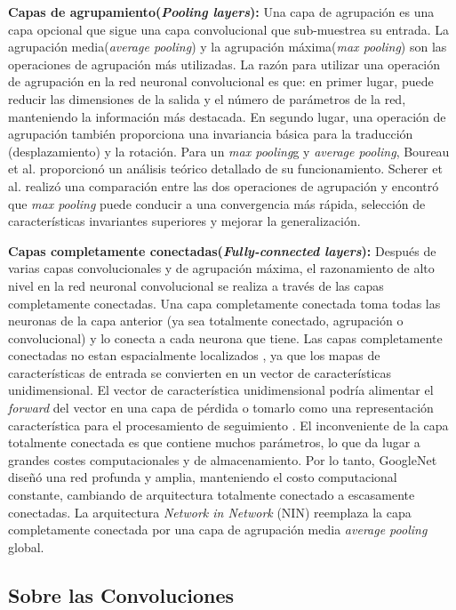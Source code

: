 \textbf{Capas de agrupamiento(\textit{Pooling layers}):} Una capa de agrupación es una capa opcional que sigue una capa convolucional que sub-muestrea su entrada. La agrupación media(\textit{average pooling}) y la agrupación máxima(\textit{max pooling}) son las operaciones de agrupación más utilizadas. La razón para utilizar una operación de agrupación en la red neuronal convolucional es que: en primer lugar, puede reducir las dimensiones de la salida y el número de parámetros de la red, manteniendo la información más destacada. En segundo lugar, una operación de agrupación también proporciona una invariancia básica para la traducción (desplazamiento) y la rotación.  Para un \textit{max pooling}g y \textit{average pooling}, Boureau et al. \cite{Boureau} proporcionó un análisis teórico detallado de su funcionamiento. Scherer et al. \cite{Scherer} realizó una comparación entre las dos operaciones de agrupación y encontró que \textit{max pooling} puede conducir a una convergencia más rápida, selección de características invariantes superiores y mejorar la generalización.

\textbf{Capas completamente conectadas(\textit{Fully-connected layers}):}  Después de varias capas convolucionales y de agrupación máxima, el razonamiento de alto nivel en la red neuronal convolucional se realiza a través de las capas completamente conectadas. Una capa completamente conectada toma todas las neuronas de la capa anterior (ya sea totalmente conectado, agrupación o convolucional) y lo conecta a cada neurona que tiene. Las capas completamente conectadas no estan espacialmente localizados , ya que los mapas de características de entrada se convierten en un vector de características unidimensional. El vector de característica unidimensional podría alimentar el \textit{forward} del vector en una capa de pérdida o tomarlo como una representación característica para el procesamiento de seguimiento \cite{Girshick}. El inconveniente de la capa totalmente conectada es que contiene muchos parámetros, lo que da lugar a grandes costes computacionales y de almacenamiento. Por lo tanto, GoogleNet \cite{Szegedy} diseñó una red profunda y amplia, manteniendo el costo computacional constante, cambiando de arquitectura totalmente conectado a escasamente conectadas. La arquitectura \textit{Network in Network} (NIN) \cite{Lin} reemplaza la capa completamente conectada por una capa de agrupación media \textit{average pooling} global.



\subsection{Sobre las Convoluciones}

